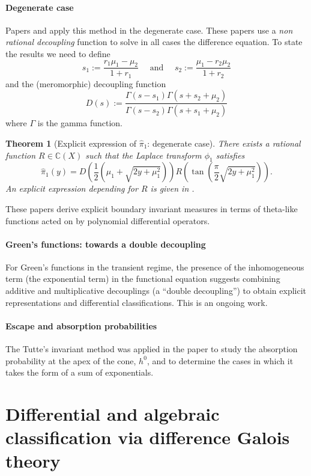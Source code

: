 \documentclass[11pt]{article}
\newtheorem{thm}{Theorem}[section]
\theoremstyle{definition}
\begin{document}
\paragraph{Degenerate case}
Papers \cite{franceschi_ichiba_karatzas_raschel_degenerate_2024} and \cite{franceschi_degenerate_asym_2025} apply this method in the degenerate case.
These papers use a \emph{non rational decoupling} function to solve in all cases the difference equation.
To state the results we need to define
$$
s_1:=\frac{r_1 \mu_1-\mu_2}{1+r_1} \quad \text { and } \quad s_2:=\frac{\mu_1-r_2 \mu_2}{1+r_2}
$$
and the (meromorphic) decoupling function
$$
D(s):=\frac{\Gamma\left(s-s_1\right) \Gamma\left(s+s_2+\mu_2\right)}{\Gamma\left(s-s_2\right) \Gamma\left(s+s_1+\mu_2\right)} 
$$
where $\Gamma$ is the gamma function.
\begin{thm}[Explicit expression of $\widehat\pi_1$: degenerate case]
There exists a rational function $R \in \mathbb{C}(X)$ such that the Laplace transform $\phi_1$ satisfies
$$
\widehat\pi_1(y)=D\left(\frac{1}{2}\left(\mu_1+\sqrt{2 y+\mu_1^2}\right)\right) R\left(\tan \left(\frac{\pi}{2} \sqrt{2 y+\mu_1^2}\right)\right) .
$$
An explicit expression depending for $R$ is given in \cite{franceschi_degenerate_asym_2025}.
\end{thm}
These papers derive explicit boundary invariant measures in terms of theta-like functions acted on by polynomial differential operators.

\paragraph{Green's functions: towards a double decoupling}
For Green's functions in the transient regime, the presence of the inhomogeneous term (the exponential term) in the functional equation suggests combining additive and multiplicative decouplings (a ``double decoupling'') to obtain explicit representations and differential classifications.
This is an ongoing work.

\paragraph{Escape and absorption probabilities}
The Tutte's invariant method was applied in the paper \cite{franceschi_flin_sumofexponential_2024} to study the absorption probability at the apex of the cone, $h^0$, and to determine the cases in which it takes the form of a sum of exponentials.

\section{Differential and algebraic classification via difference Galois theory}
\label{sec:diffgalois}
\end{document}
